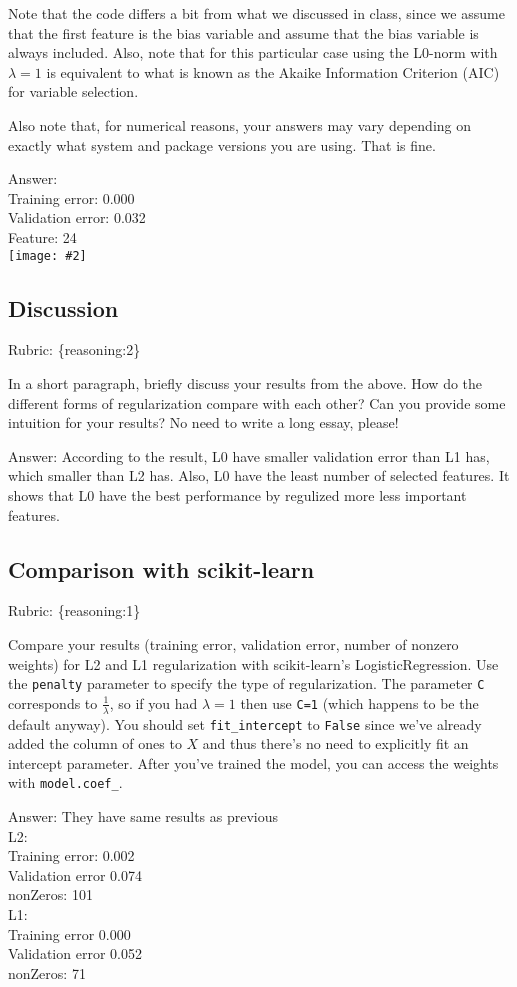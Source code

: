 \documentclass{article}
\def\rubric#1{\gre{Rubric: \{#1\}}}{}
\def\ans#1{\par\gre{Answer: #1}}
\def\gre#1{{\color{gre}#1}}
\newcommand{\fig}[2]{\texttt{[image: \#2]}}
\begin{document}
Note that the code differs a bit from what we discussed in class,
since we assume that the first feature is the bias variable and assume that the
bias variable is always included. Also, note that for this particular case using
the L0-norm with $\lambda=1$ is equivalent to what is known as the Akaike
Information Criterion (AIC) for variable selection.

Also note that, for numerical reasons, your answers may vary depending on exactly what system and package versions you are using. That is fine.

\ans{\\
	Training error: 0.000\\
	Validation error: 0.032\\
	Feature: 24}\\
\fig{1}{../figs/L0}

\subsection{Discussion}
\rubric{reasoning:2}

In a short paragraph, briefly discuss your results from the above. How do the
different forms of regularization compare with each other?
Can you provide some intuition for your results? No need to write a long essay, please!
\ans{According to the result, L0 have smaller validation error than L1 has, which smaller than L2 has. Also, L0 have the least number of selected features. It shows that L0 have the best performance by regulized more less important features. }

\subsection{Comparison with scikit-learn}
\rubric{reasoning:1}

Compare your results (training error, validation error, number of nonzero weights) for L2 and L1 regularization with scikit-learn's LogisticRegression. Use the
\texttt{penalty} parameter to specify the type of regularization. The parameter \texttt{C} corresponds to $\frac{1}{\lambda}$, so if
you had $\lambda=1$ then use \texttt{C=1} (which happens to be the default anyway).
You should set \texttt{fit\string_intercept} to \texttt{False} since we've already added the column of ones to $X$ and thus
there's no need to explicitly fit an intercept parameter. After you've trained the model, you can access the weights
with \texttt{model.coef\string_}.

\ans{
	They have same results as previous\\
	L2: \\
	Training error: 0.002\\
	Validation error 0.074\\
	nonZeros: 101\\
	L1: \\
	Training error 0.000\\
	Validation error 0.052\\
    nonZeros: 71
}
\end{document}
